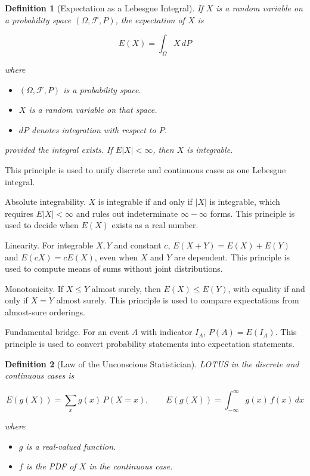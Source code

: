 \documentclass{article}
\newtheorem{definition}{Definition}
\begin{document}
\begin{mdframed}
\begin{definition}[Expectation as a Lebesgue Integral]
If $X$ is a random variable on a probability space $(\Omega,\mathcal{F},P)$, the expectation of $X$ is

$$
E(X) = \int_\Omega X\,dP
$$

where

\begin{itemize}
    \item $(\Omega,\mathcal{F},P)$ is a probability space.
    \item $X$ is a random variable on that space.
    \item $dP$ denotes integration with respect to $P$.
\end{itemize}

provided the integral exists. If $E|X|<\infty$, then $X$ is integrable.
\end{definition}
\end{mdframed}

This principle is used to unify discrete and continuous cases as one Lebesgue integral.

Absolute integrability. $X$ is integrable if and only if $|X|$ is integrable, which requires $E|X|<\infty$ and rules out indeterminate $\infty-\infty$ forms. This principle is used to decide when $E(X)$ exists as a real number.

Linearity. For integrable $X,Y$ and constant $c$, $E(X+Y)=E(X)+E(Y)$ and $E(cX)=cE(X)$, even when $X$ and $Y$ are dependent. This principle is used to compute means of sums without joint distributions.

Monotonicity. If $X\le Y$ almost surely, then $E(X)\le E(Y)$, with equality if and only if $X=Y$ almost surely. This principle is used to compare expectations from almost-sure orderings.

Fundamental bridge. For an event $A$ with indicator $I_A$, $P(A)=E(I_A)$. This principle is used to convert probability statements into expectation statements.

\begin{mdframed}
\begin{definition}[Law of the Unconscious Statistician]
LOTUS in the discrete and continuous cases is

$$
E(g(X)) = \sum_x g(x)\,P(X=x), \qquad E(g(X)) = \int_{-\infty}^{\infty} g(x)\,f(x)\,dx
$$

where

\begin{itemize}
    \item $g$ is a real-valued function.
    \item $f$ is the PDF of $X$ in the continuous case.
\end{itemize}
\end{definition}
\end{mdframed}
\end{document}
